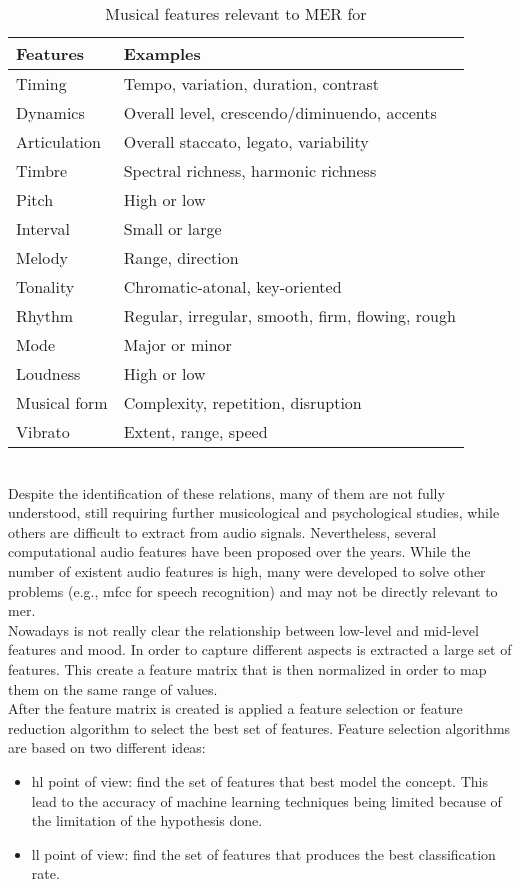 \begin{table}[h!]
\centering
	\begin{tabular}{|l|l|}
		\hline
		Features & Examples\\ [0.5ex] 
		\hline\hline Timing		&	Tempo, variation, duration, contrast \\ 
		\hline Dynamics			&	Overall level, crescendo/diminuendo, accents \\
		\hline Articulation		&	Overall staccato, legato, variability	 \\
		\hline Timbre				&	Spectral richness, harmonic richness \\
		\hline Pitch				&	High or low \\
		\hline Interval			&	Small or large \\
		\hline Melody			&	Range, direction \\
		\hline Tonality			&	Chromatic-atonal, key-oriented \\
		\hline Rhythm			&	Regular, irregular, smooth, firm, flowing, rough \\ 
		\hline Mode				&	 Major or minor \\ 
		\hline Loudness			&	 High or low \\ 
		\hline Musical form	&	 Complexity, repetition, disruption \\ 
		\hline Vibrato				&	 Extent, range, speed \\ 
		\hline
	\end{tabular}
	\caption{Musical features relevant to MER for \cite{panda2018novel}}
	\label{table:musical_features_relevant}
\end{table}
\\
Despite the identification of these relations, many of them are not fully understood, still requiring further musicological and psychological studies, while others are difficult to extract from audio signals. Nevertheless, several computational audio features have been proposed over the years. While the number of existent audio features is high, many were developed to solve other problems (e.g., \gls{mfcc} for speech recognition) and may not be directly relevant to \gls{mer}.
\\ \indent
Nowadays is not really clear the relationship between low-level and mid-level features and mood. In order to capture different aspects is extracted a large set of features. This create a feature matrix that is then normalized in order to map them on the same range of values.
\\ \indent
After the feature matrix is created is applied a feature selection or feature reduction algorithm to select the best set of features. Feature selection algorithms are based on two different ideas:
\begin{itemize}
	\item \gls{hl} point of view: find the set of features that best model the concept. This lead to the accuracy of machine learning techniques being limited because of the limitation of the hypothesis done.
	\item \gls{ll} point of view: find the set of features that produces the best classification rate.
\end{itemize}

